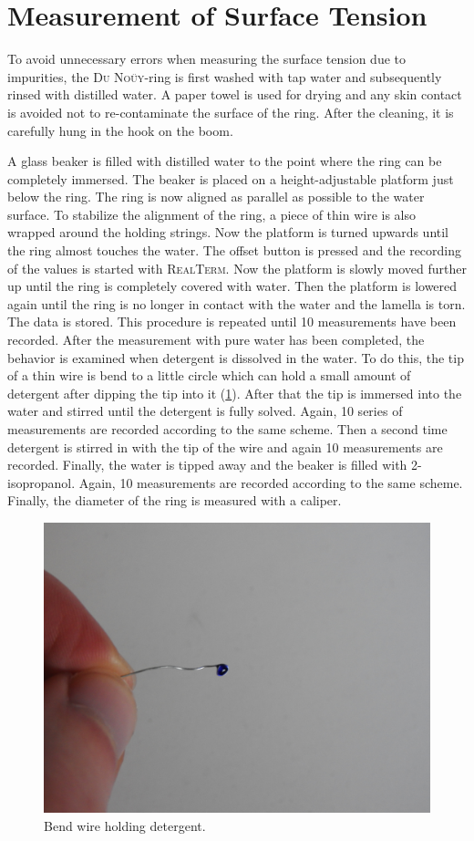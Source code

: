    \section{Measurement of Surface Tension} \label{sec:Surface_Tension}
        To avoid unnecessary errors when measuring the surface tension due to impurities, the \textsc{Du Noüy}-ring is first washed with tap
        water and subsequently rinsed with distilled water. A paper towel is used for drying and any skin contact is avoided
        not to re-contaminate the surface of the ring. After the cleaning, it is carefully hung in the hook on the boom.\par
        A glass beaker is filled with distilled water to the point where the ring can be
        completely immersed. The beaker is placed on a height-adjustable platform just below the ring. The ring is now aligned as
        parallel as possible to the water surface. To stabilize the alignment of the ring, a piece of thin wire is also wrapped
        around the holding strings. Now the platform is turned upwards until the ring almost touches the water. The offset button
        is pressed and the recording of the values is started with \textsc{RealTerm}. Now the platform is slowly moved further up
        until the ring is completely covered with water. Then the platform is lowered again until the ring is no longer in contact
        with the water and the lamella is torn. The data is stored. This procedure is repeated until 10 measurements have been
        recorded. After the measurement with pure water has been completed, the behavior is examined when detergent is dissolved
        in the water. To do this, the tip of a thin wire is bend to a little circle which can hold a small amount of detergent
        after dipping the tip into it (\cref{fig:wire_detergent}). After that the tip is immersed into the water and stirred until the detergent is fully
        solved. Again, 10 series of measurements are recorded according to the same scheme. Then a second time detergent is stirred
        in with the tip of the wire and again 10 measurements are recorded. Finally, the water is tipped away and the beaker is
        filled with 2-isopropanol. Again, 10 measurements are recorded according to the same scheme. Finally, the diameter of the
        ring is measured with a caliper.
        \begin{figure}[h]
		\centering
		\includegraphics[width=.8\textwidth]{aufbau/wire_detergent.jpg}
		\caption[]{Bend wire holding detergent.}
		\label{fig:wire_detergent}
	    \end{figure}
